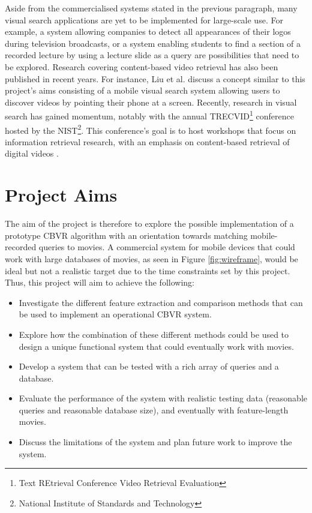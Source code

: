 Aside from the commercialised systems stated in the previous paragraph, many visual search applications are yet to be implemented for large-scale use. For example, a system allowing companies to detect all appearances of their logos during television broadcasts, or a system enabling students to find a section of a recorded lecture by using a lecture slide as a query \cite{araujo2017i2v} are possibilities that need to be explored. Research covering content-based video retrieval has also been published in recent years. For instance, Liu et al. \cite{liu2014mobilevideosearch} discuss a concept similar to this project's aims consisting of a mobile visual search system allowing users to discover videos by pointing their phone at a screen. Recently, research in visual search has gained momentum, notably with the annual TRECVID\footnote{Text REtrieval Conference Video Retrieval Evaluation} conference \cite{2018trecvidawad} hosted by the NIST\footnote{National Institute of Standards and Technology}. This conference's goal is to host workshops that focus on information retrieval research, with an emphasis on content-based retrieval of digital videos \cite{trecvid-general}.


\section{Project Aims}

The aim of the project is therefore to explore the possible implementation of a prototype CBVR algorithm with an orientation towards matching mobile-recorded queries to movies. A commercial system for mobile devices that could work with large databases of movies, as seen in Figure \ref{fig:wireframe}, would be ideal but not a realistic target due to the time constraints set by this project. Thus, this project will aim to achieve the following:

\begin{itemize}
    \item Investigate the different feature extraction and comparison methods that can be used to implement an operational CBVR system.
    \item Explore how the combination of these different methods could be used to design a unique functional system that could eventually work with movies.
    \item Develop a system that can be tested with a rich array of queries and a database.
    \item Evaluate the performance of the system with realistic testing data (reasonable queries and reasonable database size), and eventually with feature-length movies.
    \item Discuss the limitations of the system and plan future work to improve the system.
\end{itemize}

